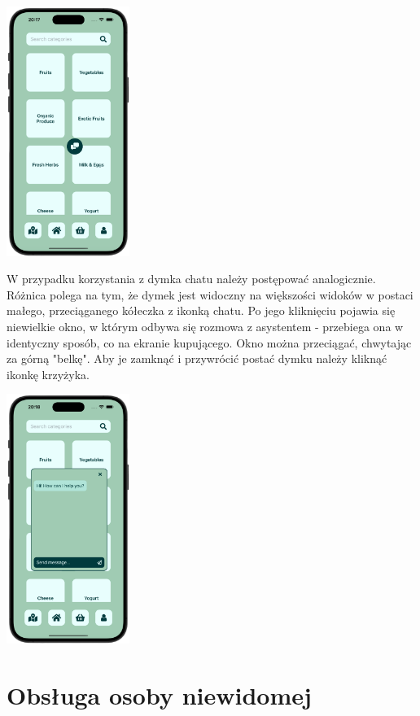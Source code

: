 \begin{center}
    \includegraphics[width=0.3\textwidth]{images/front/cat_chat.png}
\end{center}

W przypadku korzystania z dymka chatu należy postępować analogicznie. Różnica polega na tym, że dymek jest widoczny na większości widoków w postaci małego, przeciąganego kółeczka z ikonką chatu. Po jego kliknięciu pojawia się niewielkie okno, w którym odbywa się rozmowa z asystentem - przebiega ona w identyczny sposób, co na ekranie kupującego. Okno można przeciągać, chwytając za górną "belkę". Aby je zamknąć i przywrócić postać dymku należy kliknąć ikonkę krzyżyka.


\begin{center}
    \includegraphics[width=0.3\textwidth]{images/front/cat_chat_open.png}
\end{center}

\section{Obsługa osoby niewidomej}

